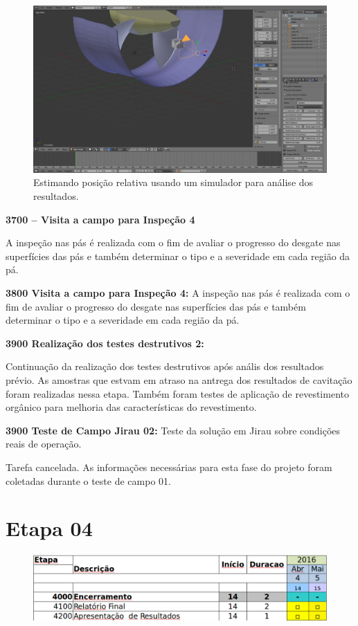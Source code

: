 \begin{figure}\centering
\includegraphics[width=0.6\columnwidth]{figs/blensor_screen}
\caption{Estimando posição relativa usando um simulador para análise dos
resultados.}
\end{figure} 



\noindent
\textbf{3700 – Visita a campo para Inspeção 4}

A inspeção nas pás é realizada com o fim de avaliar o progresso do desgate nas superfícies das
pás e também determinar o tipo e a severidade em cada região da pá.

\noindent
\textbf{3800  Visita a campo para Inspeção 4:}
A inspeção nas pás é realizada com o fim de avaliar o progresso do desgate nas superfícies das pás e também determinar o tipo e a severidade em cada região da pá. 

\noindent
\textbf{3900 Realização dos testes destrutivos 2:}

Continuação da realização dos testes destrutivos após anális dos resultados prévio. As amostras que estvam em atraso na antrega dos resultados de cavitação foram realizadas nessa etapa. Também foram testes de aplicação de revestimento orgânico para melhoria das características do revestimento.


\noindent
\textbf{3900 Teste de Campo Jirau 02:} Teste da solução  em Jirau sobre
condições reais de operação.

Tarefa cancelada. As informações necessárias para esta fase do
projeto foram coletadas durante o teste de campo 01. 

\section{Etapa 04} 

\begin{figure}[H]
\centering
\includegraphics[width=0.9\columnwidth]{figs/etapa4}
\end{figure} 

